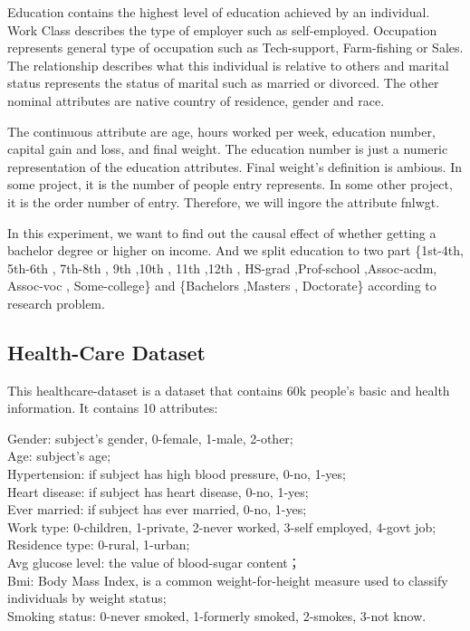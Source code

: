 \documentclass[letterpaper,12pt]{article}
\begin{document}
Education contains the highest level of education achieved by an individual. Work Class describes the type of employer such as self-employed.  Occupation represents general type of occupation such as Tech-­support, Farm-fishing or Sales. The relationship describes what this individual is relative to others and marital status represents the status of marital such as married or divorced. The other nominal attributes are native country of residence, gender and race.  \par

The continuous attribute are age, hours  worked per week, education number, capital gain and loss, and  final weight. The education number is just a numeric representation of the education attributes. Final weight's definition is ambious. In some project, it is the number of people entry represents. In some other project, it is the order number of entry. Therefore, we will ingore the attribute fnlwgt. \par

In this experiment, we want to find out the causal effect of whether getting a bachelor degree or higher on income. And we split education to two part \{1st-4th,  5th-6th , 7th-8th , 9th ,10th , 11th ,12th , HS-grad ,Prof-school ,Assoc-acdm, Assoc-voc , Some-college\} and \{Bachelors ,Masters , Doctorate\} according to research problem. \par


\subsection{Health-Care Dataset}
This healthcare-dataset is a dataset that contains 60k people’s basic and health information. It contains 10 attributes: \par
Gender: subject’s gender, 0-female, 1-male, 2-other;\\
Age: subject’s age;\\
Hypertension: if subject has high blood pressure, 0-no, 1-yes;\\
Heart disease: if subject has heart disease, 0-no, 1-yes;\\
Ever married: if subject has ever married, 0-no, 1-yes;\\
Work type: 0-children, 1-private, 2-never worked, 3-self employed, 4-govt job;\\
Residence type: 0-rural, 1-urban;\\
Avg glucose level: the value of blood-sugar content；\\
Bmi: Body Mass Index, is a common weight-for-height measure used to classify individuals by weight status;\\
Smoking status: 0-never smoked, 1-formerly smoked, 2-smokes, 3-not know.\par
\end{document}
